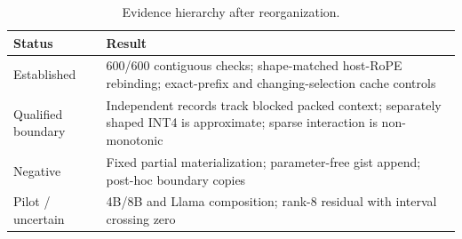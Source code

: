 \documentclass[11pt]{article}
\begin{document}
\begin{table}[h]
\centering
\caption{Evidence hierarchy after reorganization.}
\small
\begin{tabular}{p{.20\linewidth}p{.70\linewidth}}
\toprule
Status & Result \\
\midrule
Established & 600/600 contiguous checks; shape-matched host-RoPE rebinding; exact-prefix and changing-selection cache controls \\
Qualified boundary & Independent records track blocked packed context; separately shaped INT4 is approximate; sparse interaction is non-monotonic \\
Negative & Fixed partial materialization; parameter-free gist append; post-hoc boundary copies \\
Pilot / uncertain & 4B/8B and Llama composition; rank-8 residual with interval crossing zero \\
\bottomrule
\end{tabular}
\end{table}
\end{document}
